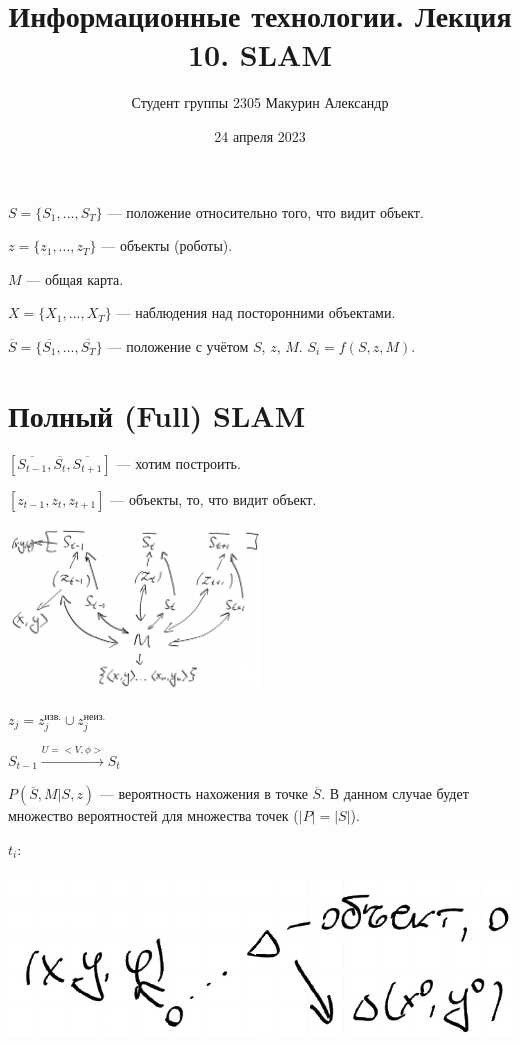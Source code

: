 \documentclass[12pt]{article}
\title{Информационные технологии. Лекция 10. SLAM}
\author{Студент группы 2305 Макурин Александр}
\date{24 апреля 2023}
\begin{document}
\maketitle
$S = \{S_1, ..., S_T\}$ — положение относительно того, что видит объект.

$z = \{z_1, ..., z_T\}$ — объекты (роботы).

$M$ — общая карта.

$X = \{X_1, ..., X_T\}$ — наблюдения над посторонними объектами.

$\overline{S} = \{\overline{S_1}, ..., \overline{S_T}\}$ — положение с учётом $S$, $z$, $M$. $S_i = f(S, z, M)$.

\section{Полный (Full) SLAM}

$[\overline{S_{t-1}}, \overline{S_t}, \overline{S_{t + 1}}]$ — хотим построить.

$[z_{t - 1}, z_t, z_{t+1}]$ — объекты, то, что видит объект.

\includegraphics[width=0.5\textwidth]{graphics/pic01.png}

$z_j = z_j^{\text{изв.}} \cup z_j^{\text{неиз.}}$

$S_{t-1} \xrightarrow{U = <V, \phi>} S_t$

$P(\overline{S}, M|S, z)$ — вероятность нахожения в точке $\overline{S}$. В данном случае будет множество вероятностей для множества точек ($|P|=|S|$).

$t_i$:

\includegraphics[height=0.1\textheight]{graphics/pic02.png}
\end{document}
